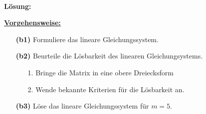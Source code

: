 \ \\
\textbf{Lösung:}
\begin{mdframed}
\underline{\textbf{Vorgehensweise:}}
\renewcommand{\labelenumi}{\theenumi.}
\begin{enumerate}
\item[\textbf{(b1)}] Formuliere das lineare Gleichungssystem.
\item[\textbf{(b2)}] Beurteile die Lösbarkeit des linearen Gleichungsystems.
\begin{enumerate}
	\item[1.] Bringe die Matrix in eine obere Dreiecksform
	\item[2.] Wende bekannte Kriterien für die Lösbarkeit an.
\end{enumerate}
\item[\textbf{(b3)}] Löse das lineare Gleichungssystem für $m = 5$.
\end{enumerate}
\end{mdframed}

